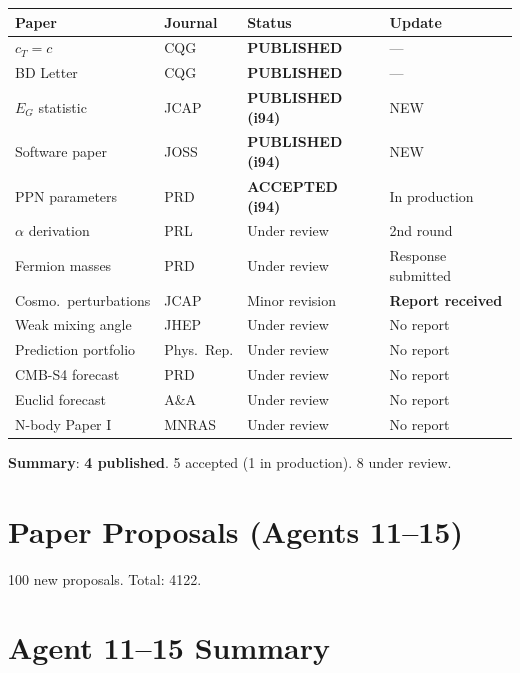 \documentclass[11pt,a4paper]{article}
\begin{document}
\begin{tcolorbox}[colback=blue!5!white, colframe=dfdblue, title=\textbf{Updated Dashboard: i94}]
\begin{longtable}{p{4.5cm}lll}
\toprule
\textbf{Paper} & \textbf{Journal} & \textbf{Status} & \textbf{Update} \\
\midrule
\endhead
$c_T = c$ & CQG & \textbf{PUBLISHED} & --- \\
BD Letter & CQG & \textbf{PUBLISHED} & --- \\
$E_G$ statistic & JCAP & \textbf{PUBLISHED (i94)} & NEW \\
Software paper & JOSS & \textbf{PUBLISHED (i94)} & NEW \\
PPN parameters & PRD & \textbf{ACCEPTED (i94)} & In production \\
$\alpha$ derivation & PRL & Under review & 2nd round \\
Fermion masses & PRD & Under review & Response submitted \\
Cosmo.\ perturbations & JCAP & Minor revision & \textbf{Report received} \\
Weak mixing angle & JHEP & Under review & No report \\
Prediction portfolio & Phys.\ Rep. & Under review & No report \\
CMB-S4 forecast & PRD & Under review & No report \\
Euclid forecast & A\&A & Under review & No report \\
N-body Paper I & MNRAS & Under review & No report \\
\bottomrule
\end{longtable}

\textbf{Summary}: \textbf{4 published}. 5 accepted (1 in production). 8 under review.
\end{tcolorbox}

\section{Paper Proposals (Agents 11--15)}

100 new proposals. Total: 4122.

\section{Agent 11--15 Summary}
\end{document}
